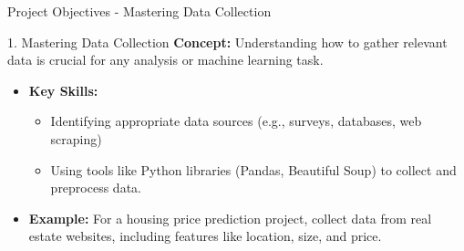 \documentclass[aspectratio=169]{beamer}
\begin{document}
\begin{frame}[fragile]{Project Objectives - Mastering Data Collection}
    \begin{block}{1. Mastering Data Collection}
        \textbf{Concept:} Understanding how to gather relevant data is crucial for any analysis or machine learning task.
        \begin{itemize}
            \item \textbf{Key Skills:} 
                \begin{itemize}
                    \item Identifying appropriate data sources (e.g., surveys, databases, web scraping)
                    \item Using tools like Python libraries (Pandas, Beautiful Soup) to collect and preprocess data.
                \end{itemize}
            \item \textbf{Example:} For a housing price prediction project, collect data from real estate websites, including features like location, size, and price.
        \end{itemize}
    \end{block}
\end{frame}
\end{document}

